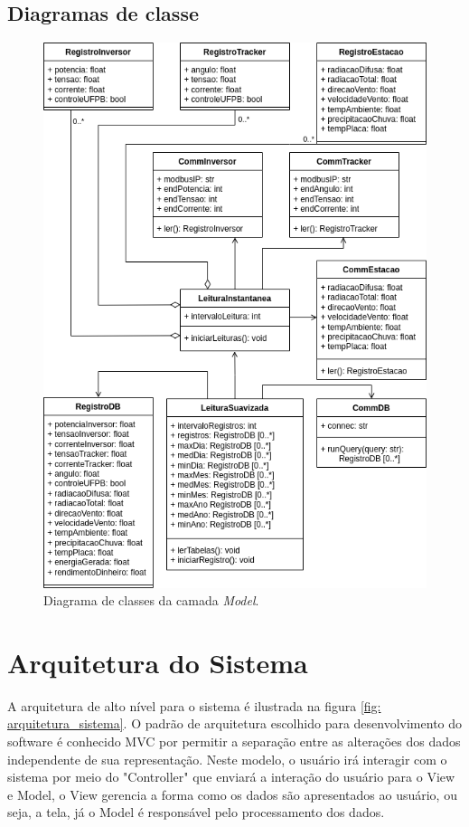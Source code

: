 \documentclass[a4paper,12pt]{article}
\begin{document}
\subsection{Diagramas de classe}

\begin{figure}
    \centering
    \includegraphics[width=\linewidth]{diagrama de classes.drawio.png}
    \caption{Diagrama de classes da camada \textit{Model}.}
    \label{fig:diagrama-classes-model}
\end{figure}


\section{Arquitetura do Sistema}
A arquitetura de alto nível para o sistema é ilustrada na figura \ref{fig: arquitetura_sistema}. O padrão de arquitetura escolhido para desenvolvimento do software é conhecido MVC por permitir a separação entre as alterações dos dados independente de sua representação. Neste modelo, o usuário irá interagir com o sistema por meio do "Controller" que enviará a interação do usuário para o View e Model, o View gerencia a forma como os dados são apresentados ao usuário, ou seja, a tela, já o Model é responsável pelo processamento dos dados.
\end{document}

